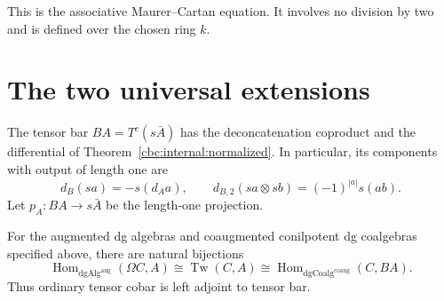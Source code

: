 This is the associative Maurer--Cartan equation.
It involves no division by two and is defined over the chosen ring $k$.

\section{The two universal extensions}
The tensor bar $BA=T^c(s\bar A)$ has the deconcatenation coproduct and the differential of Theorem~\ref{cbc:internal:normalized}.
In particular, its components with output of length one are
\[
 d_B(sa)=-s(d_Aa),\qquad d_{B,2}(sa\otimes sb)=(-1)^{|a|}s(ab).
\]
Let $p_A:BA\to s\bar A$ be the length-one projection.

\begin{theorem}\label{cbc:cobar:adjunction}
For the augmented dg algebras and coaugmented conilpotent dg coalgebras specified above, there are natural bijections
\begin{equation}\label{eq:cbc:cobar:adjunction}
 \operatorname{Hom}_{\mathrm{dgAlg}^{\mathrm{aug}}}(\Omega C,A)
 \cong\operatorname{Tw}(C,A)
 \cong\operatorname{Hom}_{\mathrm{dgCoalg}^{\mathrm{coaug}}}(C,BA).
\end{equation}
Thus ordinary tensor cobar is left adjoint to tensor bar.
\end{theorem}
